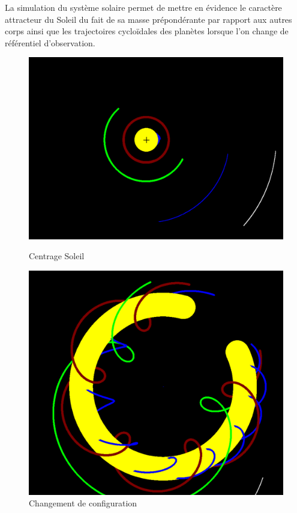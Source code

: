 \documentclass[a4paper, 12pt]{article}
\begin{document}
La simulation du système solaire permet de mettre en évidence le caractère attracteur du Soleil du fait de sa masse prépondérante par rapport aux autres corps ainsi que les trajectoires cycloïdales des planètes lorsque l'on change de référentiel d'observation.
	\begin{figure}[H]
    	\centering
    	\begin{minipage}{0.3\linewidth}
        	\centering
        	\includegraphics[width=\linewidth]{img/systemeSolaireCentrage1.png}
        	\caption{\label{fig:systsolaire1} Centrage Soleil}
    	\end{minipage}
    	\hspace{0.05\linewidth}  %
    	\begin{minipage}{0.25\linewidth}
        	\centering
        	\includegraphics[width=\linewidth]{img/systemesolaireCentrage2.png}
        	\caption{\label{fig:systsolaire2} Changement de configuration} 
    	\end{minipage}
	\end{figure} 
\end{document}
